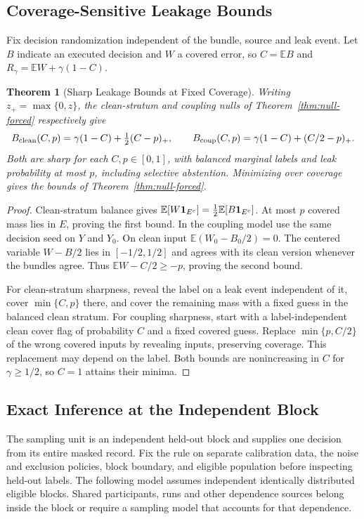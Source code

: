 \documentclass[11pt,a4paper]{article}
\newtheorem{theorem}{Theorem}[section]
\begin{document}
\subsection{Coverage-Sensitive Leakage Bounds}

Fix decision randomization independent of the bundle, source and leak event. Let $B$ indicate an executed decision and $W$ a covered error, so $C=\mathbb E B$ and $R_\gamma=\mathbb E W+\gamma(1-C)$.

\begin{theorem}[Sharp Leakage Bounds at Fixed Coverage]\label{thm:coverage-sensitive-leakage}
Writing $z_+=\max\{0,z\}$, the clean-stratum and coupling nulls of Theorem~\ref{thm:null-forced} respectively give
\[
 B_{\rm clean}(C,p)=\gamma(1-C)+\tfrac12(C-p)_+,\qquad
 B_{\rm coup}(C,p)=\gamma(1-C)+(C/2-p)_+ .
\]
Both are sharp for each $C,p\in[0,1]$, with balanced marginal labels and leak probability at most $p$, including selective abstention. Minimizing over coverage gives the bounds of Theorem~\ref{thm:null-forced}.
\end{theorem}
\begin{proof}
Clean-stratum balance gives $\mathbb E[W{\bf1}_{E^c}]=\tfrac12\mathbb E[B{\bf1}_{E^c}]$. At most $p$ covered mass lies in $E$, proving the first bound. In the coupling model use the same decision seed on $Y$ and $Y_0$. On clean input $\mathbb E(W_0-B_0/2)=0$. The centered variable $W-B/2$ lies in $[-1/2,1/2]$ and agrees with its clean version whenever the bundles agree. Thus $\mathbb E W-C/2\ge-p$, proving the second bound.

For clean-stratum sharpness, reveal the label on a leak event independent of it, cover $\min\{C,p\}$ there, and cover the remaining mass with a fixed guess in the balanced clean stratum. For coupling sharpness, start with a label-independent clean cover flag of probability $C$ and a fixed covered guess. Replace $\min\{p,C/2\}$ of the wrong covered inputs by revealing inputs, preserving coverage. This replacement may depend on the label. Both bounds are nonincreasing in $C$ for $\gamma\ge1/2$, so $C=1$ attains their minima.
\end{proof}

\subsection{Exact Inference at the Independent Block}

The sampling unit is an independent held-out block and supplies one decision from its entire masked record. Fix the rule on separate calibration data, the noise and exclusion policies, block boundary, and eligible population before inspecting held-out labels. The following model assumes independent identically distributed eligible blocks. Shared participants, runs and other dependence sources belong inside the block or require a sampling model that accounts for that dependence.
\end{document}
